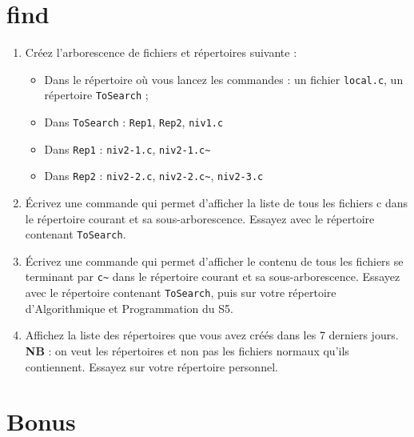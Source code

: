 \documentclass[a4paper]{article}
\begin{document}
\section{find}

\begin{enumerate}
\item Créez l'arborescence de fichiers et répertoires suivante :
  \begin{itemize}
  \item Dans le répertoire où vous lancez les commandes : un fichier
    \texttt{local.c}, un répertoire \texttt{ToSearch} ;
  \item Dans \texttt{ToSearch} : \texttt{Rep1}, \texttt{Rep2}, \texttt{niv1.c}
  \item Dans \texttt{Rep1} : \texttt{niv2-1.c}, \texttt{niv2-1.c\~}
  \item Dans \texttt{Rep2} : \texttt{niv2-2.c}, \texttt{niv2-2.c\~}, \texttt{niv2-3.c}
  \end{itemize}
\item Écrivez une commande qui permet d'afficher la liste de tous les
  fichiers c dans le répertoire courant et sa sous-arborescence. Essayez
  avec le répertoire contenant \texttt{ToSearch}.
\item Écrivez une commande qui permet d'afficher le contenu de tous les
  fichiers se terminant par \texttt{c\~} dans le répertoire courant et
  sa sous-arborescence. Essayez avec le répertoire contenant
  \texttt{ToSearch}, puis sur votre répertoire d'Algorithmique et Programmation du
  S5.
\item Affichez la liste des répertoires que vous avez créés dans les 7
  derniers jours. \textbf{NB} : on veut les répertoires et non pas les
  fichiers normaux qu'ils contiennent. Essayez sur votre répertoire
  personnel.
\end{enumerate}

\section{Bonus}
\end{document}
